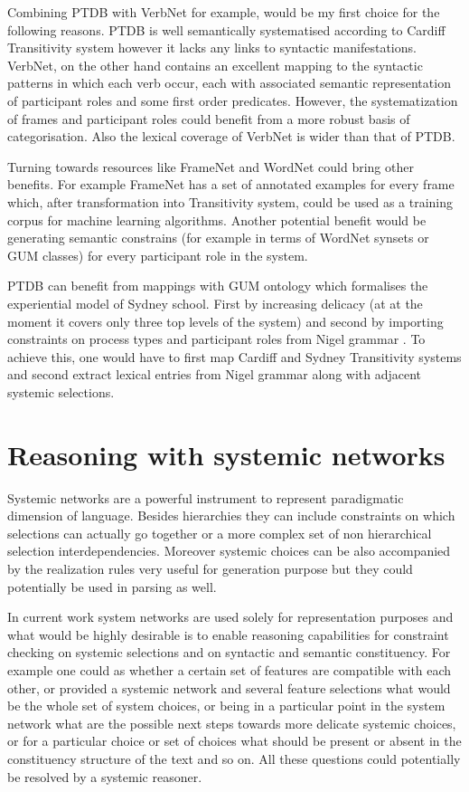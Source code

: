 Combining PTDB with VerbNet for example, would be my first choice for the following reasons. PTDB is well semantically systematised according to Cardiff Transitivity system however it lacks any links to syntactic manifestations. VerbNet, on the other hand contains an excellent mapping to the syntactic patterns in which each verb occur, each with associated semantic representation of participant roles and some first order predicates. However, the systematization of frames and participant roles could benefit from a more robust basis of categorisation. Also the lexical coverage of VerbNet is wider than that of PTDB. 

Turning towards resources like FrameNet and WordNet could bring other benefits. For example FrameNet has a set of annotated examples for every frame which, after transformation into Transitivity system, could be used as a training corpus for machine learning algorithms. Another potential benefit would be generating semantic constrains (for example in terms of WordNet \citep{Miller1995} synsets or GUM \citep{Bateman1995,Bateman2010} classes) for every participant role in the system.

PTDB can benefit from mappings with GUM ontology which formalises the experiential model of Sydney school. First by increasing delicacy (at at the moment it covers only three top levels of the system) and second by importing constraints on process types and participant roles from Nigel grammar \citep{Matthiessen1985}. To achieve this, one would have to first map Cardiff and Sydney Transitivity systems and second extract lexical entries from Nigel grammar along with adjacent systemic selections. 

\section{Reasoning with systemic networks}
Systemic networks are a powerful instrument to represent paradigmatic dimension of language. Besides hierarchies they can include constraints on which selections can actually go together or a more complex set of non hierarchical selection interdependencies. Moreover systemic choices can be also accompanied by the realization rules very useful for generation purpose but they could potentially be used in parsing as well. 

In current work system networks are used solely for representation purposes and what would be highly desirable is to enable reasoning capabilities for constraint checking on systemic selections and on syntactic and semantic constituency. For example one could as whether a certain set of features are compatible with each other, or provided a systemic network and several feature selections what would be the whole set of system choices, or being in a particular point in the system network what are the possible next steps towards more delicate systemic choices, or for a particular choice or set of choices what should be present or absent in the constituency structure of the text and so on. All these questions could potentially be resolved by a systemic reasoner. 

